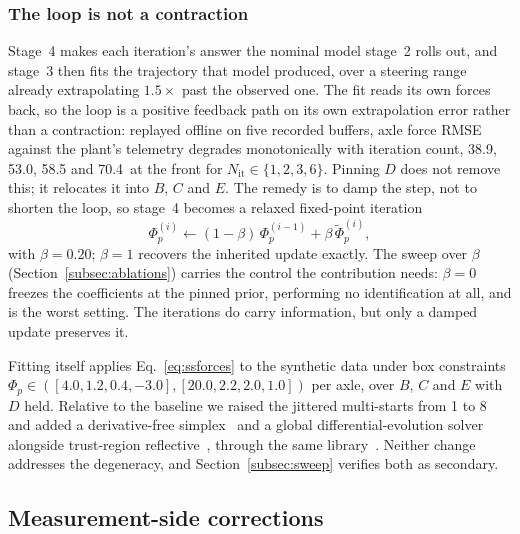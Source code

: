 \documentclass[lineno,12pt]{sn-jnl}
\makeatletter
\newif\ifsiu@prev
\DeclareRobustCommand{\siu@sep}{\ifsiu@prev\,\fi}
\DeclareRobustCommand{\siu@unit}[1]{\siu@sep\text{#1}\siu@prevtrue}
\DeclareRobustCommand{\siu@pre}[1]{\siu@sep\text{#1}\siu@prevfalse}
\DeclareRobustCommand{\siu@div}[1]{\text{#1}\siu@prevfalse}
\DeclareRobustCommand{\meter}{m}
\DeclareRobustCommand{\second}{s}
\DeclareRobustCommand{\gram}{g}
\DeclareRobustCommand{\newton}{N}
\DeclareRobustCommand{\radian}{rad}
\DeclareRobustCommand{\hertz}{Hz}
\DeclareRobustCommand{\percent}{\%}
\DeclareRobustCommand{\g}{\textit{g}}
\DeclareRobustCommand{\kilo}{k}
\DeclareRobustCommand{\milli}{m}
\DeclareRobustCommand{\per}{/}
\DeclareRobustCommand{\squared}{\ensuremath{^{2}}}
\providecommand{\degree}{\ensuremath{^{\circ}}}
\DeclareRobustCommand{\si}[1]{\begingroup
  \siu@prevfalse
  \renewcommand{\meter}{\siu@unit{m}}%
  \renewcommand{\second}{\siu@unit{s}}%
  \renewcommand{\gram}{\siu@unit{g}}%
  \renewcommand{\newton}{\siu@unit{N}}%
  \renewcommand{\radian}{\siu@unit{rad}}%
  \renewcommand{\hertz}{\siu@unit{Hz}}%
  \renewcommand{\percent}{\siu@unit{\%}}%
  \renewcommand{\degree}{\siu@unit{\ensuremath{^{\circ}}}}%
  \renewcommand{\g}{\siu@unit{\textit{g}}}%
  \renewcommand{\kilo}{\siu@pre{k}}%
  \renewcommand{\milli}{\siu@pre{m}}%
  \renewcommand{\per}{\siu@div{/}}%
  \renewcommand{\squared}{\ensuremath{^{2}}}%
  #1\endgroup}
\DeclareRobustCommand{\num}[1]{#1}
\DeclareRobustCommand{\SI}[2]{#1\,\si{#2}}
\newcommand{\phip}{\Phi_{p}}
\theoremstyle{thmstyleone}%
\theoremstyle{thmstyletwo}%
\theoremstyle{thmstylethree}%
\makeatother
\begin{document}
\subsubsection{The loop is not a contraction}
Stage~4 makes each iteration's answer the nominal model stage~2 rolls out, and
stage~3 then fits the trajectory that model produced, over a steering range
already extrapolating $1.5\times$ past the observed one. The fit reads its own
forces back, so the loop is a positive feedback path on its own extrapolation
error rather than a contraction: replayed offline on five recorded buffers, axle
force RMSE against the plant's telemetry degrades monotonically with iteration
count, \num{38.9}, \num{53.0}, \num{58.5} and \SI{70.4}{\newton} at the front
for $N_{\mathrm{it}}\in\{1,2,3,6\}$. Pinning $D$ does not remove this; it
relocates it into $B$, $C$ and $E$. The remedy is to damp the step, not to
shorten the loop, so stage~4 becomes a relaxed fixed-point iteration
\begin{equation}
\phip^{(i)} \leftarrow (1-\beta)\,\phip^{(i-1)} + \beta\,\tilde\phip^{(i)},
\label{eq:relax}
\end{equation}
with $\beta=\num{0.20}$; $\beta=1$ recovers the inherited update exactly. The
sweep over $\beta$ (Section~\ref{subsec:ablations}) carries the control the
contribution needs: $\beta=0$ freezes the coefficients at the pinned prior,
performing no identification at all, and is the worst setting. The iterations do
carry information, but only a damped update preserves it.

Fitting itself applies Eq.~\eqref{eq:ssforces} to the synthetic data under box
constraints $\phip\in([4.0,1.2,0.4,-3.0],[20.0,2.2,2.0,1.0])$ per axle, over
$B$, $C$ and $E$ with $D$ held. Relative to the baseline we raised the jittered
multi-starts from 1 to 8 and added a derivative-free
simplex~\cite{neldermead1965} and a global differential-evolution
solver~\cite{storn1997de} alongside trust-region
reflective~\cite{branch1999trust}, through the same
library~\cite{virtanen2020scipy}. Neither change addresses the degeneracy, and
Section~\ref{subsec:sweep} verifies both as secondary.

\subsection{Measurement-side corrections}
\label{subsec:measurement}
\end{document}
